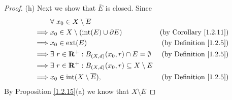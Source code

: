 \begin{proof}{(h)}
    Next we show that \(\overline{E}\) is closed.
    Since
    \begin{align*}
        & \forall\ x_0 \in X \setminus \overline{E} \\
        \implies & x_0 \in X \setminus (\text{int}(E) \cup \partial E) & \text{(by Corollary \ref{1.2.11})} \\
        \implies & x_0 \in \text{ext}(E) & \text{(by Definition \ref{1.2.5})} \\
        \implies & \exists\ r \in \mathbf{R}^+ : B_{(X, d)}(x_0, r) \cap E = \emptyset & \text{(by Definition \ref{1.2.5})} \\
        \implies & \exists\ r \in \mathbf{R}^+ : B_{(X, d)}(x_0, r) \subseteq X \setminus E \\
        \implies & x_0 \in \text{int}(X \setminus \overline{E}), & \text{(by Definition \ref{1.2.5})}
    \end{align*}
    By Proposition \ref{1.2.15}(a) we know that \(X \setminus \overline{E}\)
\end{proof}